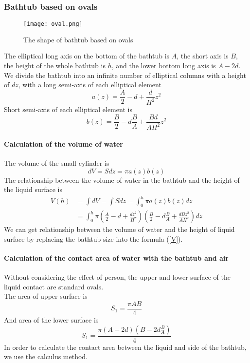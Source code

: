\documentclass{mcmthesis}
\begin{document}
\subsubsection{Bathtub based on ovals}
\begin{figure}[H]
\centerline{\texttt{[image: oval.png]}}
\caption{The shape of bathtub based on ovals}
\label{oval}	
\end{figure}
The elliptical long axis on the bottom of the bathtub is $A$, the short axis is $B$, the height of the whole bathtub is $h$, and the lower bottom long axis is $A-2d$.\\
\indent We divide the bathtub into an infinite number of elliptical columns with a height of $dz$, with a long semi-axis of each elliptical element\\
\begin{equation}
a(z)=\frac{A}{2}-d+\frac{d}{{H}^{2}}{z}^{2}
\end{equation}
\indent Short semi-axis of each elliptical element is
\begin{equation}
b(z)=\frac{B}{2}-d\frac{B}{A}+\frac{Bd}{A{H}^{2}}{z}^{2}
\end{equation}\\
\textbf{Calculation of the volume of water} \\\\
\indent The volume of the small cylinder is
\begin{equation}
dV=Sdz=\pi a(z)b(z)
\end{equation}
\indent The relationship between the volume of water in the bathtub and the height of the liquid surface is
\begin{equation}
\begin{split}
V(h)&=\int dV=\int Sdz=\int_{0}^{h}\pi a(z)b(z)dz \\
&=\int_{0}^{h}\pi(\frac{A}{2}-d+\frac{d{z}^{2}}{{H}^{2}})(\frac{B}{2}-d\frac{B}{A}+\frac{dB{z}^{2}}{A{H}^{2}})dz
\label{V}
\end{split}
\end{equation}
\indent We can get relationship between the volume of water and the height of liquid surface by replacing the bathtub size into the formula (\ref{V}).\\\\
\textbf{Calculation of the contact area of water with the bathtub and air} \\\\
\indent Without considering the effect of person, the upper and lower surface of the liquid contact are standard ovals.\\
\indent The area of upper surface is\\
\begin{equation}
S_{1}=\frac{\pi AB}{4}
\end{equation}
\indent And area of the lower surface is\\
\begin{equation}
	S_{1}=\frac{\pi (A-2d)(B-2d\frac{B}{A})}{4}
\end{equation}
\indent In order to calculate the contact area between the liquid and side of the bathtub, we use the calculus method.
\end{document}
